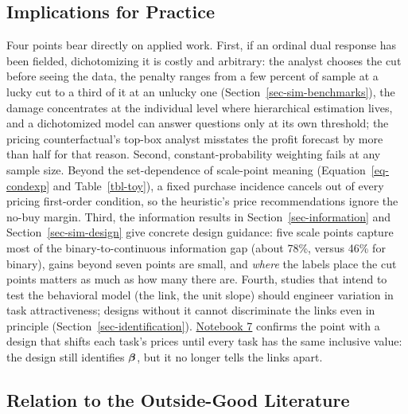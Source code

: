 \documentclass[
  letterpaper,
  DIV=11,
  numbers=noendperiod]{scrartcl}
\theoremstyle{plain}
\theoremstyle{plain}
\theoremstyle{plain}
\theoremstyle{remark}
\begin{document}
\subsection{Implications for Practice}\label{implications-for-practice}

Four points bear directly on applied work. First, if an ordinal dual
response has been fielded, dichotomizing it is costly and arbitrary: the
analyst chooses the cut before seeing the data, the penalty ranges from
a few percent of sample at a lucky cut to a third of it at an unlucky
one (Section~\ref{sec-sim-benchmarks}), the damage concentrates at the
individual level where hierarchical estimation lives, and a dichotomized
model can answer questions only at its own threshold; the pricing
counterfactual's top-box analyst misstates the profit forecast by more
than half for that reason. Second, constant-probability weighting fails
at any sample size. Beyond the set-dependence of scale-point meaning
(Equation~\ref{eq-condexp} and Table~\ref{tbl-toy}), a fixed purchase
incidence cancels out of every pricing first-order condition, so the
heuristic's price recommendations ignore the no-buy margin. Third, the
information results in Section~\ref{sec-information} and
Section~\ref{sec-sim-design} give concrete design guidance: five scale
points capture most of the binary-to-continuous information gap (about
78\%, versus 46\% for binary), gains beyond seven points are small, and
\emph{where} the labels place the cut points matters as much as how many
there are. Fourth, studies that intend to test the behavioral model (the
link, the unit slope) should engineer variation in task attractiveness;
designs without it cannot discriminate the links even in principle
(Section~\ref{sec-identification}).
\href{notebooks/07-scale-design.qmd}{Notebook 7} confirms the point with
a design that shifts each task's prices until every task has the same
inclusive value: the design still identifies \(\boldsymbol{\beta}\), but it no
longer tells the links apart.

\subsection{Relation to the Outside-Good
Literature}\label{relation-to-the-outside-good-literature}
\end{document}

